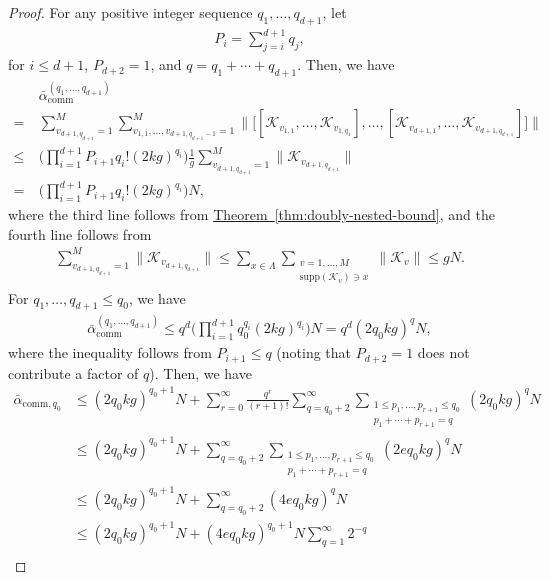 \documentclass[11pt]{article}
\newcommand{\thm}[1]{\hyperref[thm:#1]{Theorem~\ref*{thm:#1}}}
\renewcommand{\comm}{\mathrm{comm}}
\newcommand{\supp}{\mathrm{supp}}
\newcommand{\mc}{\mathcal}
\begin{document}
\begin{proof} 
    For any positive integer sequence $q_1, \ldots, q_{d+1}$, let 
    \begin{align*}
        P_{i} = \sum_{j=i}^{d+1} q_j,
    \end{align*}
    for $i\le d+1$, $P_{d+2} = 1$, and $q = q_1+\cdots+q_{d+1}$. Then, we have 
    \begin{align*}
    &\bar{\alpha}_{\comm}^{(q_1, \ldots, q_{d+1})}\\
    =~& \sum_{v_{d+1, q_{d+1}}=1}^{M} \sum_{v_{1,1}, \ldots, v_{d+1, q_{d+1}-1} = 1}^M \bigg\| \Big[ 
         [\mc K_{v_{1,1}}, \ldots, \mc K_{v_{1,q_1}}], \ldots, 
        [\mc K_{v_{d+1,1}}, \ldots, \mc K_{v_{d+1,q_{d+1}}}]
     \Big] \bigg\| \\
    \le~& \bigg(\prod_{i=1}^{d+1}P_{i+1}q_i!(2kg)^{q_i }\bigg)\frac{1}{g}\sum_{v_{d+1, q_{d+1}}=1}^{M} \|\mc K_{v_{d+1, q_{d+1}}}\|\\
    =~&  \bigg(\prod_{i=1}^{d+1}P_{i+1}q_i!(2kg)^{q_i }\bigg)N,
\end{align*}
where the third line follows from \thm{doubly-nested-bound}, and the fourth line follows from 
\begin{align*}
    \sum_{v_{d+1,q_{d+1}}=1}^{M}\|\mc K_{v_{d+1, q_{d+1}}}\|\le \sum_{x\in\Lambda}\sum_{\substack{v = 1, \ldots, M \\ \supp(\mc K_v)\ni x}} \|\mc K_{v}\|\le gN.
\end{align*}
For $q_1, \ldots, q_{d+1}\le q_0$, we have 
\begin{align*}
    \bar{\alpha}_{\comm}^{(q_1, \ldots, q_{d+1})}\le q^{d}\bigg(\prod_{i=1}^{d+1}q_0^{q_{i}}(2kg)^{q_i }\bigg)N = q^{d} (2q_0kg)^q N,
\end{align*}
where the inequality follows from $P_{i+1}\le q$ (noting that $P_{d+2} = 1$ does not contribute a factor of $q$). 
Then, we have 
\begin{align*}
    \bar{\alpha}_{\comm,q_0} &\le (2q_0 kg)^{q_0+1} N+ \sum_{r = 0}^{\infty}\frac{q^{r} }{(r+1)!} \sum_{q=q_0+2}^{\infty}\sum_{\substack{1\le p_1, \ldots, p_{r+1}\le q_0\\p_1+\cdots+p_{r+1} = q}}(2q_0 kg)^q N \\ 
    &\le  (2q_0 kg)^{q_0+1} N+  \sum_{q=q_0+2}^{\infty}\sum_{\substack{1\le p_1, \ldots, p_{r+1}\le q_0\\p_1+\cdots+p_{r+1} = q}} (2eq_0 kg)^q N\\
    &\le(2q_0 kg)^{q_0+1} N+  \sum_{q=q_0+2}^{\infty} (4eq_0 kg)^q N   \\
    &\le (2q_0kg)^{q_0+1} N + (4eq_0 kg)^{q_0+1} N \sum_{q = 1}^{\infty} 2^{-q} \\

\end{align*}
\end{proof}
\end{document}
